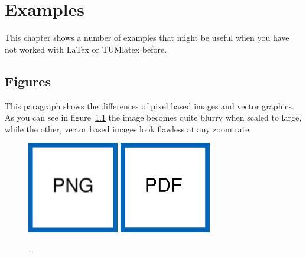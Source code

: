 \chapter{Examples}%

This chapter shows a number of examples that might be useful when you have not worked with LaTex or TUMlatex before.

\section{Figures}
This paragraph shows the differences of pixel based images and vector graphics.
As you can see in figure~\cref{fig:MyImage} the  image becomes quite blurry when scaled to large, while the other, vector based images look flawless at any zoom rate.%
%
\begin{figure}[htb]%
    \centering%
    \includegraphics[width=40mm]{figures/ImagePNG.png}%
    \hspace*{5mm}%
    \includegraphics[width=40mm]{figures/ImagePDF.pdf}\par%
    \begingroup%
    \resizebox{40mm}{!}{}%
    \endgroup%
    \hspace*{5mm}%
    \begingroup%
    \def\svgwidth{40mm}%
    \fontsize{25}{25}\selectfont%
    \endgroup%
    \caption{.}%
    \label{fig:MyImage}%
\end{figure}%

